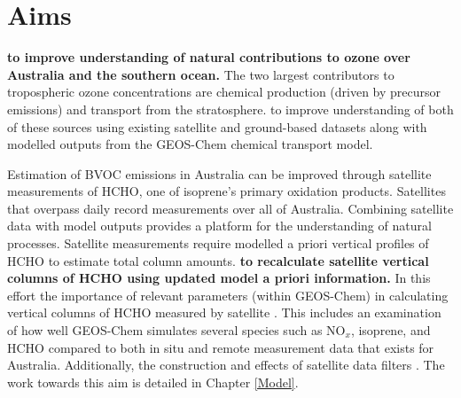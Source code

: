 \section{Aims}
\label{LR:Aims}

  \textbf{to improve understanding of natural contributions to ozone over Australia and the southern ocean.}
  The two largest contributors to tropospheric ozone concentrations are chemical production (driven by precursor emissions) and transport from the stratosphere.
  to improve understanding of both of these sources using existing satellite and ground-based datasets along with modelled outputs from the GEOS-Chem chemical transport model.
  
  Estimation of BVOC emissions in Australia can be improved through satellite measurements of HCHO, one of isoprene's primary oxidation products.
  Satellites that overpass daily record measurements over all of Australia.
  Combining satellite data with model outputs provides a platform for the understanding of natural processes.
  Satellite measurements require modelled a priori vertical profiles of HCHO to estimate total column amounts.
  \textbf{to recalculate satellite vertical columns of HCHO using updated model a priori information.}
  In this effort the importance of relevant parameters (within GEOS-Chem) in calculating vertical columns of HCHO measured by satellite .
  This includes an examination of how well GEOS-Chem simulates several species such as NO$_x$, isoprene, and HCHO compared to both in situ and remote measurement data that exists for Australia.
  Additionally, the construction and effects of satellite data filters .
  The work towards this aim is detailed in Chapter \ref{Model}.
  
